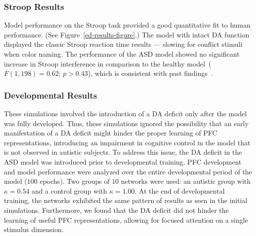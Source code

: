 \subsubsection{Stroop Results} 
Model performance on the Stroop task provided a good quantitative fit to human performance. (See Figure~\ref{ed-results-figure}.) The model with intact DA function displayed the classic Stroop reaction time results --- slowing for conflict stimuli when color naming. The performance of the ASD model showed no significant increase in Stroop interference in comparison to the healthy model~($F(1,198) = 0.62$; $p > 0.43$), which is consistent with past findings~\cite{Ozonoff:1999:AutismStroopWCST}.

\subsubsection{Developmental Results}
These simulations involved the introduction of a DA deficit only after the model was fully developed. Thus, these simulations ignored the possibility that an early manifestation of a DA deficit might hinder the proper learning of PFC representations, introducing an impairment in cognitive control in the model that is not observed in autistic subjects. To address this issue, the DA deficit in the ASD model was introduced prior to developmental training. PFC development and model performance were analyzed over the entire developmental period of the model ($100$ epochs). Two groups of $10$ networks were used: an autistic group with $\kappa = 0.54$ and a control group with $\kappa = 1.00$. At the end of developmental training, the networks exhibited the same pattern of results as seen in the initial simulations. Furthermore, we found that the DA deficit did not hinder the learning of useful PFC representations, allowing for focused attention on a single stimulus dimension.



